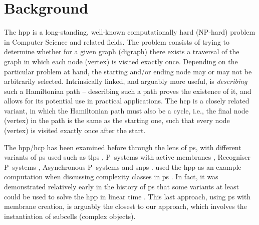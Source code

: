\section{Background}

The \gls{hpp} is a long-standing, well-known computationally hard (NP-hard) problem in Computer Science and related fields.  The problem consists of trying to determine whether for a given graph (digraph) there exists a traversal of the graph in which each node (vertex) is visited exactly once.  Depending on the particular problem at hand, the starting and/or ending node may or may not be arbitrarily selected.  Intrinsically linked, and arguably more useful, is \emph{describing} such a Hamiltonian path -- describing such a path proves the existence of it, and allows for its potential use in practical applications.  The \gls{hcp} is a closely related variant, in which the Hamiltonian path must also be a cycle, i.e., the final node (vertex) in the path is the same as the starting one, such that every node (vertex) is visited exactly once after the start.


The \gls{hpp}/\gls{hcp} has been examined before through the lens of \gls{ps}, with different variants of \gls{ps} used such as \gls{tlps} \cite{Martin-Vide2003}, P~systems with active membranes \cite{Pan2006,Song2013}, Recogniser P~systems \cite{Chen2009}, Asynchronous P~systems \cite{Tagawa2012} and \gls{snps} \cite{Xue2013}.  \citeauthor{Jimenez2003} used the \gls{hpp} as an example computation when discussing complexity classes in \gls{ps} \cite{Jimenez2003}.  In fact, it was demonstrated relatively early in the history of \gls{ps} that some variants at least could be used to solve the \gls{hpp} in linear time \cite{Mutyam2001}.  This last approach, using \gls{ps} with membrane creation, is arguably the closest to our approach, which involves the instantiation of subcells (complex objects).

